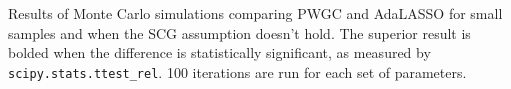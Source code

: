 \documentclass[12pt]{article}
\begin{document}
\begin{table}

  {\scriptsize Results of Monte Carlo simulations comparing PWGC and
    AdaLASSO for small samples and when the SCG assumption doesn't
    hold.  The superior result is bolded when the difference is
    statistically significant, as measured by
    \texttt{scipy.stats.ttest\_rel}.  100 iterations are run for each
    set of parameters.}
\end{table}
\end{document}
